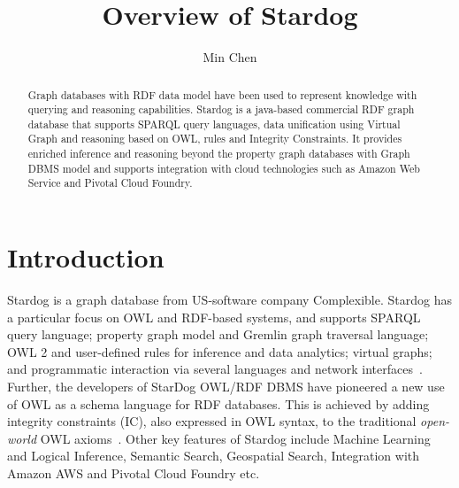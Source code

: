 \title{Overview of Stardog}


\author{Min Chen}


\renewcommand{\shortauthors}{M. Chen}


\begin{abstract}
Graph databases with RDF data model have been used to represent 
knowledge with querying and reasoning capabilities. Stardog is a java-based 
commercial RDF graph database that supports SPARQL query languages, 
data unification using Virtual Graph and reasoning based on OWL, rules and 
Integrity Constraints. It provides enriched inference and reasoning beyond 
the property graph databases with Graph DBMS model and supports 
integration with cloud technologies such as Amazon Web Service and Pivotal 
Cloud Foundry.

\end{abstract}



\maketitle


\section{Introduction}

Stardog is a graph database from US-software company
Complexible. Stardog has a particular focus on OWL and RDF-based
systems, and supports SPARQL query language; property graph model and 
Gremlin graph traversal language; OWL 2 and user-defined rules for 
inference and data analytics; virtual graphs; and
programmatic interaction via several languages and network
interfaces~\cite{hid-sp18-405-www-stardog-docs}. Further, the
developers of StarDog OWL/RDF DBMS have pioneered a new use of OWL as
a schema language for RDF databases. This is achieved by adding
integrity constraints (IC), also expressed in OWL syntax, to the traditional 
\textit{open-world} OWL 
axioms~\cite{hid-sp18-405-cer2012graphical-stardog}. Other key
features of Stardog include Machine Learning and Logical Inference,
Semantic Search, Geospatial Search, Integration with Amazon AWS and 
Pivotal Cloud Foundry etc.\ 

